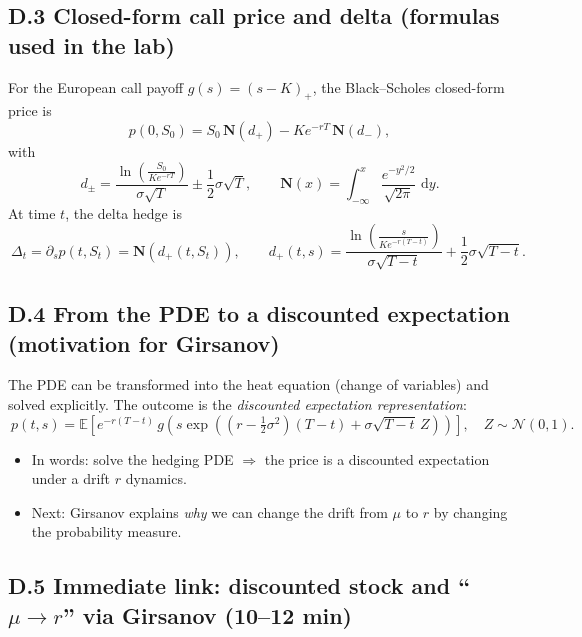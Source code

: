 \documentclass[11pt]{article}
\newcommand{\E}{\mathbb{E}}
\newcommand{\Nbb}{\mathcal{N}}
\newcommand{\dd}{\,\mathrm{d}}
\newcommand{\1}{\mathbf{1}}
\begin{document}
\subsection*{D.3 Closed-form call price and delta (formulas used in the lab)}

For the European call payoff $g(s)=(s-K)_+$, the Black--Scholes closed-form price is
\[
p(0,S_0)=S_0\,\mathbf N(d_+)-Ke^{-rT}\,\mathbf N(d_-),
\]
with
\[
d_\pm=\frac{\ln\!\left(\frac{S_0}{Ke^{-rT}}\right)}{\sigma\sqrt{T}}
\pm\frac12\sigma\sqrt{T},
\qquad
\mathbf N(x)=\int_{-\infty}^x\frac{e^{-y^2/2}}{\sqrt{2\pi}}\,\dd y.
\]
At time $t$, the delta hedge is
\[
\boxed{\ \Delta_t
=\partial_s p(t,S_t)
=\mathbf N\!\left(d_+(t,S_t)\right),\qquad
d_+(t,s)=\frac{\ln\!\left(\frac{s}{Ke^{-r(T-t)}}\right)}{\sigma\sqrt{T-t}}
+\frac12\sigma\sqrt{T-t}. }
\]

\subsection*{D.4 From the PDE to a discounted expectation (motivation for Girsanov)}

The PDE can be transformed into the heat equation (change of variables) and solved explicitly.
The outcome is the \emph{discounted expectation representation}:
\[
\boxed{\ p(t,s)
=
\E\!\left[e^{-r(T-t)}\,g\!\left(s\exp\!\left((r-\tfrac12\sigma^2)(T-t)+\sigma\sqrt{T-t}\,Z\right)\right)\right],
\quad Z\sim\Nbb(0,1). }
\]

\begin{itemize}[leftmargin=1.4em, itemsep=0.15em]
\item In words: solve the hedging PDE $\Rightarrow$ the price is a discounted expectation under a drift $r$ dynamics.
\item Next: Girsanov explains \emph{why} we can change the drift from $\mu$ to $r$ by changing the probability measure.
\end{itemize}




\subsection*{D.5 Immediate link: discounted stock and ``$\mu \to r$'' via Girsanov (10--12 min)}
\end{document}
